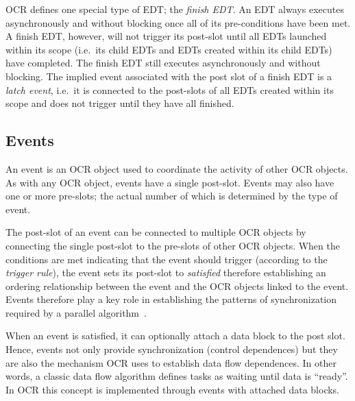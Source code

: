 OCR defines one special type of EDT; the \emph{finish
EDT}. An EDT always executes asynchronously and
without blocking once all of its pre-conditions have been met. A
finish EDT, however, will not trigger its post-slot until all EDTs
launched within its scope (i.e.\ its child EDTs and EDTs created
within its child EDTs) have completed.  The finish EDT still executes
asynchronously and without blocking. The implied event associated with
the post slot of a finish EDT is a \emph{latch event}, i.e.\ it is
connected to the post-slots of all EDTs created within its scope and
does not trigger until they have all finished.

\subsection{Events}
\label{sec:Event}

An event is an OCR object used to coordinate the activity of other OCR
objects. As with any OCR object, events have a single
post-slot. Events may also have one or more pre-slots; the actual
number of which is determined by the type of event.

The post-slot of an event can be connected to multiple OCR objects by
connecting the single post-slot to the pre-slots of other OCR objects.
When the conditions are met indicating that the event should trigger
(according to the \emph{trigger rule}), the event
sets its post-slot to \emph{satisfied} therefore establishing an
ordering relationship between the event and the OCR objects linked to
the event. Events therefore play a key role in establishing the
patterns of synchronization required by a parallel
algorithm~\cite{ImSa14-2}.

When an event is satisfied, it can optionally attach a data block to
the post slot. Hence, events not only provide synchronization
(control dependences) but they are also the mechanism OCR uses to
establish data flow dependences. In other words, a classic data flow
algorithm defines tasks as waiting until data is ``ready''. In OCR
this concept is implemented through events with attached data blocks.

